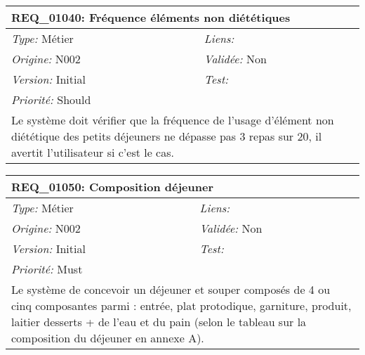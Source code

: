 \begin{table}[!h]

\begin{tabular}{|p{60mm}p{100mm}|}

\hline

\multicolumn{2}{|l|}{\textbf{REQ\_01040:} Fréquence éléments non diététiques} \\ \hline

\emph{Type:} Métier & \emph{Liens:}  \\

\emph{Origine:} N002 & \emph{Validée:} Non \\

\emph{Version:} Initial & \emph{Test:}  \\

\emph{Priorité:} Should & \\ \hline

\multicolumn{2}{|p{16cm}|}{Le système doit vérifier que la fréquence de l'usage d'élément non diététique des petits déjeuners ne dépasse pas 3 repas sur 20, il avertit l'utilisateur si c'est le cas.} \\ \hline

\end{tabular}

\end{table}



\begin{table}[!h]

\begin{tabular}{|p{60mm}p{100mm}|}

\hline

\multicolumn{2}{|l|}{\textbf{REQ\_01050:} Composition déjeuner} \\ \hline

\emph{Type:} Métier & \emph{Liens:}  \\

\emph{Origine:} N002 & \emph{Validée:} Non \\

\emph{Version:} Initial & \emph{Test:}  \\

\emph{Priorité:} Must & \\ \hline

\multicolumn{2}{|p{16cm}|}{Le système de concevoir un déjeuner et souper composés de 4 ou cinq composantes parmi : entrée, plat protodique, garniture, produit, laitier desserts + de l'eau et du pain (selon le tableau sur la composition du déjeuner en annexe A).} \\ \hline

\end{tabular}

\end{table}



